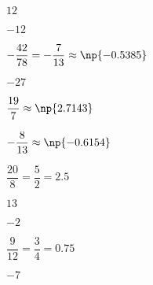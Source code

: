 {{\item$12$  \item$-12$  \item$-\dfrac{42}{78} = -\dfrac{7}{13} \approx \np{-0.5385}$
\item$-27$  \item$\dfrac{19}{7} \approx \np{2.7143}$  \item$-\dfrac{8}{13} \approx \np{-0.6154}$
\item$\dfrac{20}{8} = \dfrac{5}{2} = 2.5$  \item$13$  \item$-2$
\item$\dfrac{9}{12} = \dfrac{3}{4} = 0.75$  \item$-7$  }}